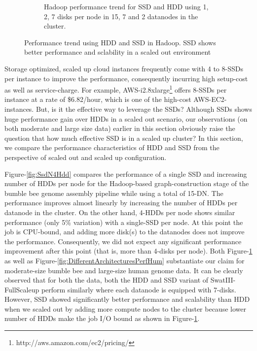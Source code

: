 \documentclass[conference]{IEEEtran}
\begin{document}
\begin{figure}[h]
\begin{subfigure}[b]{0.23\textwidth}
          \caption{Hadoop performance trend for SSD and HDD using 1, 2, 7 disks per node in 15, 7 and 2 datanodes in the cluster.}
          \label{fig:SsdNHddDiffNodes}
  \end{subfigure}
  \caption{Performance trend using HDD and SSD in Hadoop. SSD shows better performance and sclability in a scaled out environment}
  \label{fig:SsdNHdd}
  \vspace{-1.9em}
\end{figure}

Storage optimized, scaled up cloud instances frequently come with 4 to 8-SSDs per instance to improve the performance, consequently incurring high setup-cost as well as service-charge.
For example, AWS-i2.8xlarge\footnote{http://aws.amazon.com/ec2/pricing/} offers 8-SSDs per instance at a rate of \$6.82/hour, which is one of the high-cost AWS-EC2-instances.
But, is it the effective way to leverage the SSDs?
Although SSDs shows huge performance gain over HDDs in a scaled out scenario, our observations (on both moderate and large size data) earlier in this section obviously raise the question that how much effective SSD is in a scaled up cluster?
In this section, we compare the performance characteristics of HDD and SSD from the perspective of scaled out and scaled up configuration.

Figure-\ref{fig:SsdN4Hdd} compares the performance of a single SSD and increasing number of HDDs per node for the Hadoop-based graph-construction stage of the bumble bee genome assembly pipeline while using a total of 15-DN.
The performance improves almost linearly by increasing the number of HDDs per datanode in the cluster.
On the other hand, 4-HDDs per node shows similar performance (only 5\% variation) with a single-SSD per node.
At this point the job is CPU-bound, and adding more disk(s) to the datanodes does not improve the performance.
Consequently, we did not expect any significant performance improvement after this point (that is, more than 4-disks per node). 
Both Figure-\ref{fig:SsdNHddDiffNodes} as well as Figure-\ref{fig:DifferentArchitecturesPerfHum} substantiate our claim for moderate-size bumble bee and large-size human genome data. It can be clearly observed that for both the data, both the HDD and SSD variant of SwatIII-FullScaleup perform similarly where each datanode is equipped with 7-disks.
However, SSD showed significantly better performance and scalability than HDD when we scaled out by adding more compute nodes to the cluster because lower number of HDDs make the job I/O bound as shown in Figure-\ref{fig:SsdNHddDiffNodes}.
\end{document}
